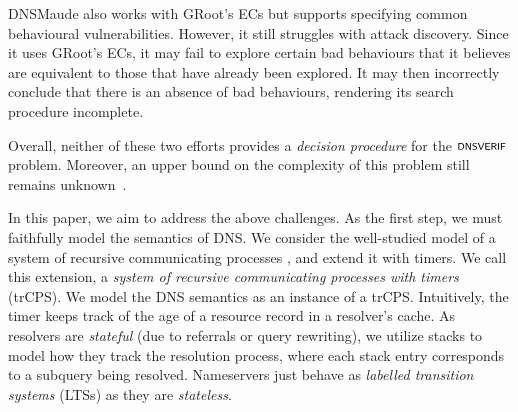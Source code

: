DNSMaude also works with GRoot's ECs but supports specifying common behavioural vulnerabilities. However, it still struggles with 
attack discovery. Since it uses GRoot's ECs, it may fail to explore certain bad behaviours that it believes are equivalent to those that have already been explored. It may then incorrectly conclude that there is an absence of bad behaviours, rendering its search procedure incomplete.


Overall, neither of these two efforts provides a \emph{decision procedure} for the $\scrsf{dnsverif}$ problem. Moreover, an upper bound on the complexity of this problem still remains unknown~\cite{dns-complex}.  





 In this paper, we aim to address the above challenges. 
As the first step, we must faithfully model the semantics of DNS. We consider the well-studied model of a system of recursive communicating processes \cite{heussner2010reachability,heussner2012reachability}, and extend it with timers. We call this extension, a \emph{system of recursive communicating processes with timers} (trCPS). We  model the DNS semantics as an instance of a trCPS. 
Intuitively, the timer keeps track of the age of a resource record in a resolver’s cache. 
As resolvers are \emph{stateful} (due to referrals or query rewriting),
we utilize stacks to model how they  track the resolution process, where  each stack entry corresponds to a subquery being resolved. 
Nameservers just behave as \emph{labelled transition systems} (LTSs) as they are \emph{stateless}.


